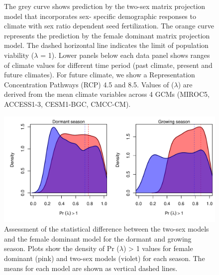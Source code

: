 \documentclass[12pt]{article}\usepackage[]{graphicx}\usepackage[dvipsnames]{xcolor}
\begin{document}
\begin{figure}[H]
\begin{center}
{			The grey curve shows prediction by the two-sex matrix projection model that incorporates sex- specific demographic responses to climate with sex ratio dependent seed fertilization.
			The orange curve represents the prediction by the female dominant matrix projection model.
			The dashed horizontal line indicates the limit of population viability ($\lambda$ = 1).
			Lower panels below each data panel shows  ranges of climate values for different time period (past climate, present and future climates).
			For future climate, we show a Representation Concentration Pathways (RCP) 4.5 and 8.5. Values of ($\lambda$) are derived from the mean climate variables across 4 GCMs (MIROC5, ACCESS1-3, CESM1-BGC, CMCC-CM).
		}
		\label{fig:lambda_LTRE}
	\end{center}
\end{figure}


\begin{figure}[H]
	\begin{center}
		\includegraphics[width=0.99\linewidth]{Figures/Niche_overestimation.pdf}
		\caption{ Assessment of the statistical difference between the two-sex models and the female dominant model for the dormant and growing season. 
			Plots show the density of Pr ($\lambda$) > 1 values for female dominant (pink) and two-sex models (violet) for each season. 
			The means for each model are shown as vertical dashed lines. }
		\label{Sup:Niche_overestimation}
	\end{center}
\end{figure}
\end{document}
